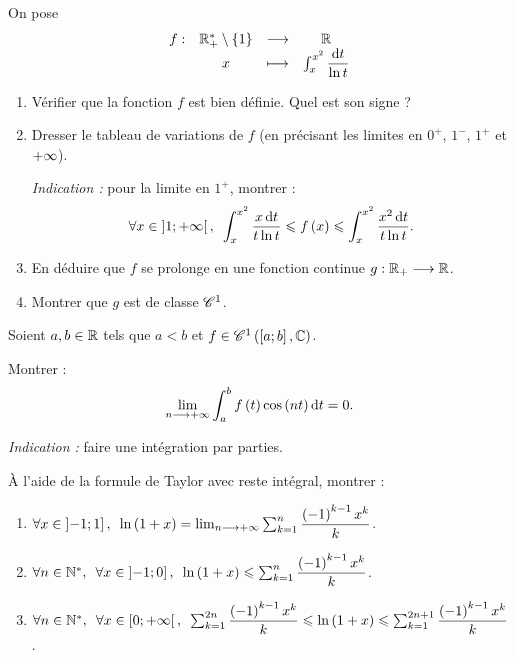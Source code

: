 \begin{exo}
On pose \[\fonction{f}{\Rps\excluant\accol{1}}{\R}{x}{\int_x^{x^2}\dfrac{\odif{t}}{\ln t}}\]

\begin{enumerate}
\item Vérifier que la fonction \(f\) est bien définie. Quel est son signe ? \\

\item Dresser le tableau de variations de \(f\) (en précisant les limites en \(0^+\), \(1^-\), \(1^+\) et \(+\infty\)).

\textit{Indication :} pour la limite en \(1^+\), montrer : \[\quantifs{\forall x\in\intervee{1}{\pinf}}\int_x^{x^2}\dfrac{x\odif{t}}{t\ln t}\leq f\paren{x}\leq\int_x^{x^2}\dfrac{x^2\odif{t}}{t\ln t}.\]

\item En déduire que \(f\) se prolonge en une fonction continue \(g:\mathbb{R}_+\longrightarrow\mathbb{R}\). \\

\item Montrer que \(g\) est de classe \(\mathscr{C}^{1}\).
\end{enumerate}
\end{exo}

\begin{corr}
\end{corr}

\begin{exo}
Soient \(a,b\in\mathbb{R}\) tels que \(a<b\) et \(f\in\mathscr{C}^{1}\left(\left[a;b\right],\mathbb{C}\right)\).

Montrer : \[\lim_{n\to\pinf}\int_a^bf\paren{t}\cos\paren{nt}\odif{t}=0.\]

\textit{Indication :} faire une intégration par parties.
\end{exo}

\begin{corr}
\end{corr}

\begin{exo}[Exercice 9]
À l'aide de la formule de Taylor avec reste intégral, montrer :

\begin{enumerate}
\item \(\quantifs{\forall x\in\intervei{-1}{1}}\ln\paren{1+x}=\lim_{n\to\pinf}\sum_{k=1}^n\dfrac{\paren{-1}^{k-1}x^k}{k}\). \\

\item \(\quantifs{\forall n\in\Ns;\forall x\in\intervei{-1}{0}}\ln\paren{1+x}\leq\sum_{k=1}^n\dfrac{\paren{-1}^{k-1}x^k}{k}\). \\

\item \(\quantifs{\forall n\in\Ns;\forall x\in\intervie{0}{\pinf}}\sum_{k=1}^{2n}\dfrac{\paren{-1}^{k-1}x^k}{k}\leq\ln\paren{1+x}\leq\sum_{k=1}^{2n+1}\dfrac{\paren{-1}^{k-1}x^k}{k}\).
\end{enumerate}
\end{exo}


